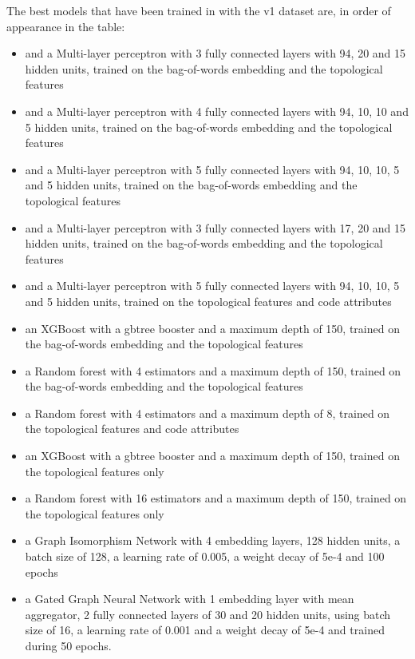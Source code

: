 \begin{appendices}
The best models that have been trained in with the v1 dataset are, in order of appearance in the table:
\begin{itemize}
 \item and a Multi-layer perceptron with 3 fully connected layers with 94, 20 and 15 hidden units, trained on the bag-of-words embedding and the topological features
  \item and a Multi-layer perceptron with 4 fully connected layers with 94, 10, 10 and 5 hidden units, trained on the bag-of-words embedding and the topological features
  \item and a Multi-layer perceptron with 5 fully connected layers with 94, 10, 10, 5 and 5 hidden units,  trained on the bag-of-words embedding and the topological features
  \item and a Multi-layer perceptron with 3 fully connected layers with 17, 20 and 15 hidden units,  trained on the bag-of-words embedding and the topological features
  \item and a Multi-layer perceptron with 5 fully connected layers with 94, 10, 10, 5 and 5 hidden units, trained on the topological features and code attributes
  \item an XGBoost with a gbtree booster and a maximum depth of 150, trained on the bag-of-words embedding and the topological features
  \item a Random forest with 4 estimators and a maximum depth of 150,  trained on the bag-of-words embedding and the topological features
  \item a Random forest with 4 estimators and a maximum depth of 8, trained on the topological features and code attributes
  \item an XGBoost with a gbtree booster and a maximum depth of 150, trained on the topological features only
  \item a Random forest with 16 estimators and a maximum depth of 150, trained on the topological features only
  \item a Graph Isomorphism Network with 4 embedding layers, 128 hidden units, a batch size of 128, a learning rate of 0.005, a weight decay of 5e-4 and 100 epochs
  \item a Gated Graph Neural Network with 1 embedding layer with mean aggregator, 2 fully connected layers of 30 and 20 hidden units, using batch size of 16, a learning rate of 0.001 and a weight decay of 5e-4 and trained during 50 epochs.
  


\end{itemize}
\end{appendices}
